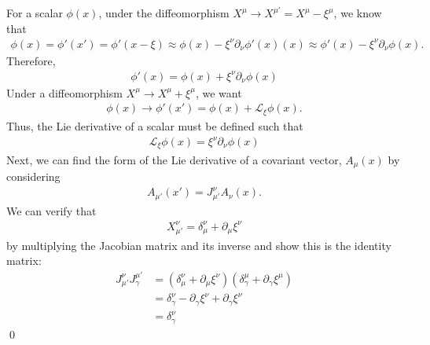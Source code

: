 \documentclass{book}
\numberwithin{equation}{section}
\theoremstyle{definition}
\newcommand{\p}{\partial}
\newcommand{\lag}{\mathcal{L}}
\begin{document}
For a scalar $\phi(x)$, under the diffeomorphism $X^\mu \to X^{\mu'} = X^\mu - \xi^\mu$, we know that 
\begin{align}
\phi(x) = \phi'(x') = \phi'(x-\xi)\approx \phi(x) - \xi^\nu\p_\nu\phi'(x)(x) \approx \phi'(x) - \xi^\nu\p_\nu \phi(x).
\end{align}
Therefore,
\begin{align}
\boxed{\phi'(x) = \phi(x) + \xi^\nu\p_\nu\phi(x)}
\end{align}
Under a diffeomorphism $X^\mu \to X^\mu + \xi^\mu$, we want
\begin{align}
\phi(x) \to \phi'(x') = \phi(x) + \lag_\xi \phi(x).
\end{align}
Thus, the Lie derivative of a scalar must be defined such that
\begin{align}
\boxed{\lag_\xi\phi(x) = \xi^\nu\p_\nu\phi(x)}
\end{align}
Next, we can find the form of the Lie derivative of a covariant vector, $A_\mu(x)$ by considering 
\begin{align}
A_{\mu'}(x') = J^\nu_{\mu'}A_\nu(x).
\end{align}
We can verify that
\begin{align}
\boxed{X^\nu_{\mu'}   = \delta^\nu_\mu + \p_\mu \xi^\nu }
\end{align}
by multiplying the Jacobian matrix and its inverse and show this is the identity matrix:
\begin{align}
J^\nu_{\mu'}J^{\mu'}_\gamma &= (\delta^\nu_\mu + \p_\mu \xi^\nu)(\delta^\mu_\gamma + \p_\gamma \xi^\mu)\\
&= \delta^{\nu}_\gamma - \p_\gamma \xi^\nu + \p_\gamma \xi^\nu \\
&= \delta^\nu_\gamma 
\end{align}\qed
\end{document}
